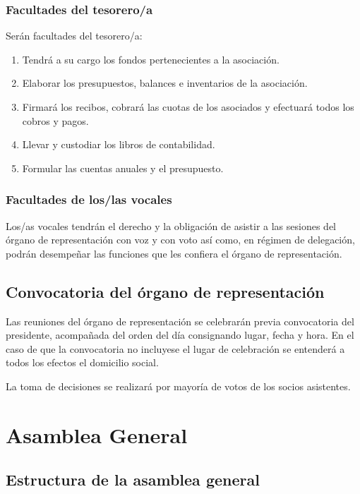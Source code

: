 \documentclass[a4paper, 12pt, oneside]{book}
\begin{document}
\subsubsection{Facultades del tesorero/a}

Serán facultades del tesorero/a:

\begin{enumerate}
    \item Tendrá a su cargo los fondos pertenecientes a la asociación.
    \item Elaborar los presupuestos, balances e inventarios de la asociación. 
    \item Firmará los recibos, cobrará las cuotas de los asociados y efectuará todos los cobros y pagos.
    \item Llevar y custodiar los libros de contabilidad. 
    \item Formular las cuentas anuales y el presupuesto.
\end{enumerate}

\subsubsection{Facultades de los/las vocales}

Los/as vocales tendrán el derecho y la obligación de asistir a las sesiones del órgano de representación con voz y con voto así como, en régimen de delegación, podrán desempeñar las funciones que les confiera el órgano de representación.

\subsection{Convocatoria del órgano de representación}

Las reuniones del órgano de representación se celebrarán previa convocatoria del presidente, acompañada del orden del día consignando lugar, fecha y hora. En el caso de que la convocatoria no incluyese el lugar de celebración se entenderá a todos los efectos el domicilio social.

La toma de decisiones se realizará por mayoría de votos de los socios asistentes.

\section{Asamblea General}

\subsection{Estructura de la asamblea general}
\end{document}
